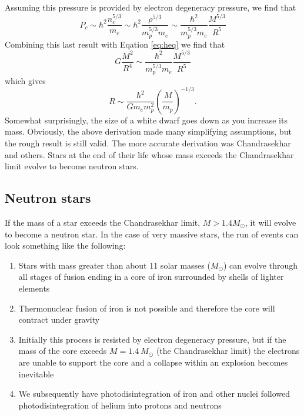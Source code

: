 \documentclass[a4paper,12pt]{article}
\theoremstyle{remark}
\renewcommand{\=}[1]{\stackrel{#1}{=}} %
\theoremstyle{plain}
\theoremstyle{definition}
\newtheorem*{definitionT}{Note}%
\newenvironment{note}{
\begin{dBox}
\begin{definitionT}}
{\end{definitionT}
\end{dBox}}
\begin{document}
Assuming this pressure is provided by electron degeneracy pressure, we find that 
\begin{equation}
P_c \sim \hbar^2 \frac{n_e ^{5/3}}{m_e} \sim \hbar^2 \frac{\rho ^{5/3}}{m_p^{5/3} m_e}  \sim \frac{\hbar^2}{m_p^{5/3} m_e} \frac{M^{5/3}}{R^5}
\end{equation}
Combining this last result with Eqation \ref{eq:heq} we find that 
\begin{equation}
G \frac{M^2}{R^4} \sim \frac{\hbar^2}{m_p^{5/3} m_e} \frac{M^{5/3}}{R^5}
\end{equation}
which gives
\begin{equation}
R \sim \frac{\hbar ^2}{G m_e m_p^2} \left( \frac{M}{m_p} \right)^{-1/3}.
\end{equation}
Somewhat surprisingly, the size of a white dwarf goes down as you increase its mass. Obviously, the above derivation made many simplifying assumptions, but the rough result is still valid. The more accurate derivation was Chandrasekhar and others. Stars at the end of their life whose mass exceeds the Chandrasekhar limit evolve to become neutron stars.


\subsection{Neutron stars}
\label{seq:neutron_star}
If the mass of a star exceeds the Chandrasekhar limit, \mbox{$M > 1.4 M_\odot$}, it will evolve to become a neutron star. In the case of very massive stars, the run of events can look something like the following:
\begin{enumerate}
\item Stars with mass greater than about 11 solar masses ($M_\odot$) can evolve through all stages of fusion ending in a core of iron surrounded by shells of lighter elements
\item Thermonuclear fusion of iron is not possible and therefore the core will contract under gravity
\item Initially this process is resisted by electron degeneracy pressure, but if the mass of the core exceeds $M = 1.4 \: M_\odot$ (the Chandrasekhar limit) the electrons are unable to support the core and a collapse within an explosion becomes inevitable
\item We subsequently have photodisintegration of iron and other nuclei followed photodisintegration of helium into protons and neutrons
\end{enumerate}
\end{document}
